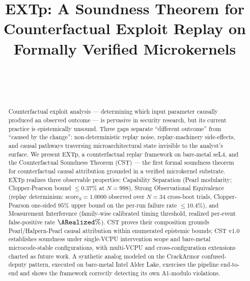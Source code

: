 \documentclass[conference]{IEEEtran}
\newcommand{\scoreS}{\text{score}_S}
\begin{document}
\title{EXTp: A Soundness Theorem for Counterfactual Exploit Replay on Formally Verified Microkernels}

\ifzenodo
\author{\\
}
\else
\author{\\
}
\fi

\maketitle
\ifzenodo
\begingroup\renewcommand{\thefootnote}{}\endgroup
\fi

\begin{abstract}
Counterfactual exploit analysis --- determining which input
parameter causally produced an observed outcome --- is pervasive
in security research, but its current practice is epistemically
unsound. Three gaps separate ``different outcome'' from ``caused
by the change'': non-deterministic replay noise, replay-machinery
side-effects, and causal pathways traversing microarchitectural
state invisible to the analyst's surface. We present EXTp, a
counterfactual replay framework on bare-metal seL4, and the
Counterfactual Soundness Theorem (CST) --- the first formal
soundness theorem for counterfactual causal attribution grounded
in a verified microkernel substrate. EXTp realizes three
observable properties: Capability
Separation (Pearl modularity; Clopper-Pearson bound
${\leq}0.37\%$ at $N{=}998$), Strong Observational Equivalence
(replay determinism: $\scoreS{=}1.0000$ observed over $N{=}34$
cross-boot trials, Clopper-Pearson one-sided $95\%$ upper bound on
the per-run failure rate ${\leq}10.4\%$), and Measurement
Interference (family-wise calibrated timing threshold,
realized per-event false-positive rate $\ARealized\%$). CST proves their
composition grounds Pearl/Halpern-Pearl causal attribution within
enumerated epistemic bounds; CST v1.0 establishes soundness under
single-VCPU intervention scope and bare-metal microcode-stable
configurations, with multi-VCPU and cross-configuration extensions
charted as future work. A synthetic analog modeled on the
CrackArmor confused-deputy pattern, executed on bare-metal Intel
Alder Lake, exercises the pipeline end-to-end and shows the
framework correctly detecting its own A1-modulo violations.
\end{abstract}
\end{document}
